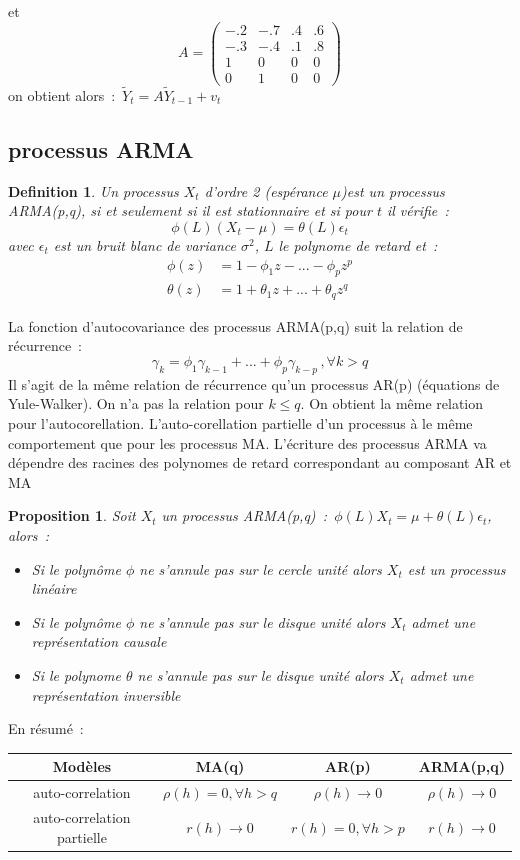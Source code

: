 \documentclass[11pt]{scrartcl} %
\newtheorem{Def}[theorem]{Definition}
\newtheorem{pro}[theorem]{Proposition}
\begin{document}
et
$$
A=\left(
\begin{array}{cccc}
-.2 & -.7 & .4 & .6\\
-.3 & -.4 & .1 & .8\\
1 & 0 & 0 & 0\\
0 & 1 & 0 & 0
\end{array}
\right)
$$
on obtient alors~:~$\tilde{Y}_t=A\tilde{Y}_{t-1}+v_t$
\subsection{processus ARMA}
\begin{Def}
Un processus $X_t$ d'ordre 2 (espérance $\mu$)est un processus ARMA(p,q), si et seulement si il est stationnaire et si pour $t$ il vérifie~:
$$
\phi(L)(X_t-\mu) = \theta(L)\epsilon_t
$$
avec $\epsilon_t$ est un bruit blanc de variance $\sigma^2$, $L$ le polynome de retard et~:
\begin{align*}
\phi(z)&=1-\phi_1z-...-\phi_pz^p\\
\theta(z)&=1+\theta_1z+...+\theta_qz^q
\end{align*}
\end{Def}
La fonction d'autocovariance des processus ARMA(p,q) suit la relation de récurrence~:
$$
\gamma_k=\phi_1\gamma_{k-1}+...+\phi_p\gamma_{k-p}\,,\forall k>q
$$
Il s'agit de la même relation de récurrence qu'un processus AR(p) (équations de Yule-Walker). On n'a pas la relation pour $k\leq q$. On obtient la même relation pour l'autocorellation. L'auto-corellation partielle d'un processus à le même comportement que pour les processus MA. L'écriture des processus ARMA va dépendre des racines des polynomes de retard correspondant au composant AR et MA
\begin{pro}
Soit $X_t$ un processus ARMA(p,q)~:~$\phi(L)X_t=\mu+\theta(L)\epsilon_t$, alors~:
\begin{itemize}
\item[i)] Si le polynôme $\phi$ ne s'annule pas sur le cercle unité alors $X_t$ est un processus linéaire
\item[ii)]Si le polynôme $\phi$ ne s'annule pas sur le disque unité alors $X_t$ admet une représentation causale
\item[iii)]Si le polynome $\theta$ ne s'annule pas sur le disque unité alors $X_t$ admet une représentation inversible
\end{itemize}
\end{pro}
En résumé~:
\begin{center}
\begin{tabular}{|c|c|c|c|}
\hline
Modèles & MA(q) & AR(p) & ARMA(p,q)\\
\hline
auto-correlation & $\rho(h)=0, \forall h>q$ &  $\rho(h)\rightarrow 0$ & $\rho(h)\rightarrow 0$ \\
\hline
auto-correlation partielle & $r(h)\rightarrow 0$ & $r(h)=0, \forall h>p$ &$r(h)\rightarrow 0$  \\
\hline
\end{tabular}
\end{center}
\end{document}
